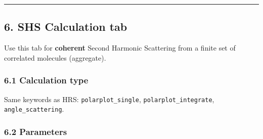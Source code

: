 \begin{center}\rule{0.5\linewidth}{0.5pt}\end{center}

\hypertarget{shs-calculation-tab}{%
\subsection{6. SHS Calculation tab}\label{shs-calculation-tab}}

Use this tab for \textbf{coherent} Second Harmonic Scattering from a
finite set of correlated molecules (aggregate).

\hypertarget{calculation-type-1}{%
\subsubsection{6.1 Calculation type}\label{calculation-type-1}}

Same keywords as HRS: \texttt{polarplot\_single},
\texttt{polarplot\_integrate}, \texttt{angle\_scattering}.

\hypertarget{parameters-1}{%
\subsubsection{6.2 Parameters}\label{parameters-1}}

